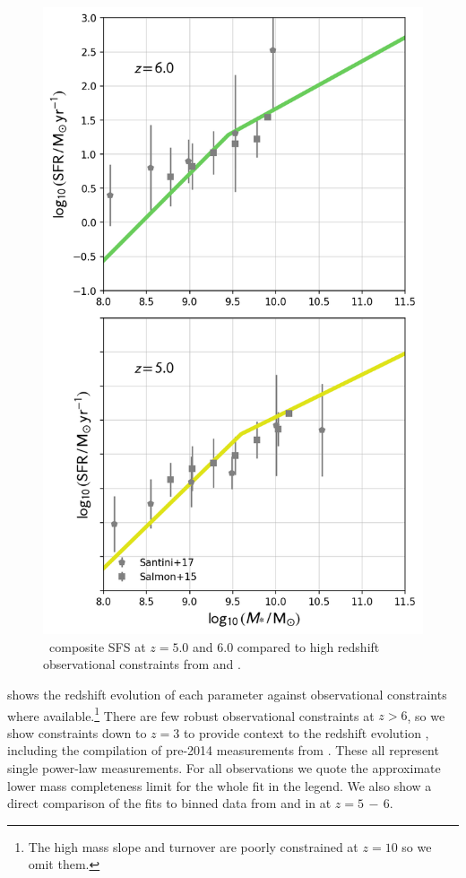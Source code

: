 \begin{figure}
	\includegraphics[width=\columnwidth]{images/sfs_obs.png}
    \caption{\flares\ composite SFS at $z = 5.0$ and $6.0$ compared to high redshift observational constraints from \protect\cite{santini_star_2017} and \protect\cite{song_evolution_2016}.
    }
    \label{fig:sfs_obs}
\end{figure}

\protect{} shows the redshift evolution of each parameter against observational constraints where available.\footnote{The high mass slope and turnover are poorly constrained at $z = 10$ so we omit them.}
There are few robust observational constraints at $z > 6$, so we show constraints down to $z = 3$ to provide context to the redshift evolution \citep{behroozi_average_2013,schreiber_herschel_2015,shivaei_mosdef_2015,salmon_relation_2015,santini_star_2017}, including the compilation of pre-2014 measurements from \cite{speagle_highly_2014}.
These all represent single power-law measurements.
For all observations we quote the approximate lower mass completeness limit for the whole fit in the legend.
We also show a direct comparison of the fits to binned data from \cite{santini_star_2017} and \cite{salmon_relation_2015} in  at $z = 5\,-\,6$.

